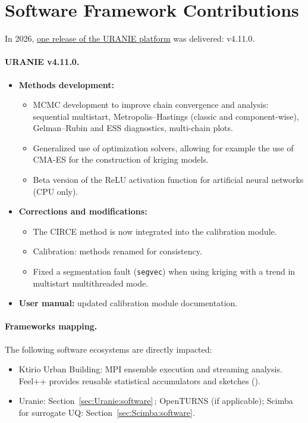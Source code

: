 \section{Software Framework Contributions}
In 2026, \href{https://uranie.cea.fr/ressources/releasenotes}{one release of the URANIE platform} was delivered: v4.11.0.

\paragraph{URANIE v4.11.0.}
\begin{itemize}
	\item \textbf{Methods development:}
	\begin{itemize}
		\item MCMC development to improve chain convergence and analysis: sequential multistart, Metropolis--Hastings (classic and component-wise), Gelman--Rubin and ESS diagnostics, multi-chain plots.
		\item Generalized use of optimization solvers, allowing for example the use of CMA-ES for the construction of kriging models.
		\item Beta version of the ReLU activation function for artificial neural networks (CPU only).
	\end{itemize}
	\item \textbf{Corrections and modifications:}
	\begin{itemize}
		\item The CIRCE method is now integrated into the calibration module.
		\item Calibration: methods renamed for consistency.
		\item Fixed a segmentation fault (\texttt{segvec}) when using kriging with a trend in multistart multithreaded mode.
	\end{itemize}
	\item \textbf{User manual:} updated calibration module documentation.
\end{itemize}

\paragraph{Frameworks mapping.} The following software ecosystems are directly impacted:
\begin{itemize}
	\item Ktirio Urban Building: MPI ensemble execution and streaming analysis. Feel++ provides reusable statistical accumulators and sketches ().
	\item Uranie: Section~\ref{sec:Uranie:software}\,; OpenTURNS (if applicable); Scimba for surrogate UQ: Section~\ref{sec:Scimba:software}.
\end{itemize}

